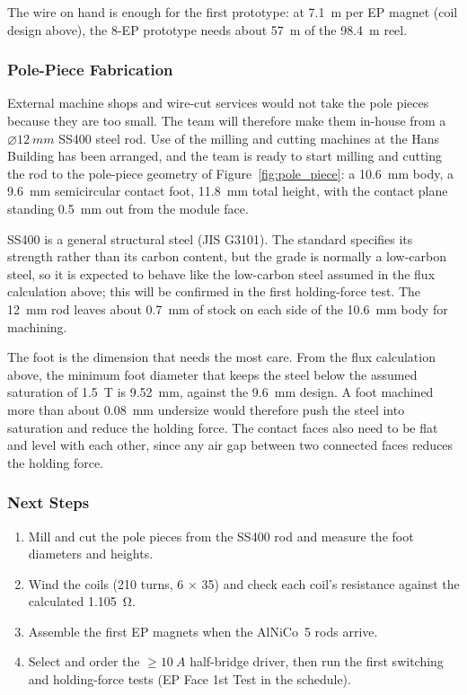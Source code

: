 \documentclass[12pt,a4paper]{article}
\begin{document}
The wire on hand is enough for the first prototype: at \SI{7.1}{m} per EP magnet
(coil design above), the 8-EP prototype needs about \SI{57}{m} of the \SI{98.4}{m} reel.

\subsubsection{Pole-Piece Fabrication}

External machine shops and wire-cut services would not take the pole pieces because they are
too small. The team will therefore make them in-house from a $\varnothing\SI{12}{mm}$ SS400
steel rod. Use of the milling and cutting machines at the Hans Building has been arranged,
and the team is ready to start milling and cutting the rod to the pole-piece geometry of
Figure~\ref{fig:pole_piece}: a
\SI{10.6}{mm} body, a \SI{9.6}{mm} semicircular contact foot, \SI{11.8}{mm} total height, with
the contact plane standing \SI{0.5}{mm} out from the module face.

SS400 is a general structural steel (JIS G3101). The standard specifies its strength rather
than its carbon content, but the grade is normally a low-carbon steel, so it is expected to
behave like the low-carbon steel assumed in the flux calculation above; this will be confirmed in the first
holding-force test. The \SI{12}{mm} rod leaves about \SI{0.7}{mm} of stock on each side of the
\SI{10.6}{mm} body for machining.

The foot is the dimension that needs the most care. From the flux calculation above, the minimum foot diameter that
keeps the steel below the assumed saturation of \SI{1.5}{T} is \SI{9.52}{mm}, against
the \SI{9.6}{mm} design. A foot machined more than about \SI{0.08}{mm} undersize would
therefore push the steel into saturation and reduce the holding force. The contact faces also
need to be flat and level with each other, since any air gap between two connected faces
reduces the holding force.

\subsubsection{Next Steps}

\begin{enumerate}
  \item Mill and cut the pole pieces from the SS400 rod and measure the foot diameters and heights.
  \item Wind the coils (210 turns, 6 $\times$ 35) and check each coil's resistance against the
        calculated \SI{1.105}{\ohm}.
  \item Assemble the first EP magnets when the AlNiCo~5 rods arrive.
  \item Select and order the $\geq\SI{10}{A}$ half-bridge driver, then run the first
        switching and holding-force tests (EP Face 1st Test in the schedule).
\end{enumerate}
\end{document}

